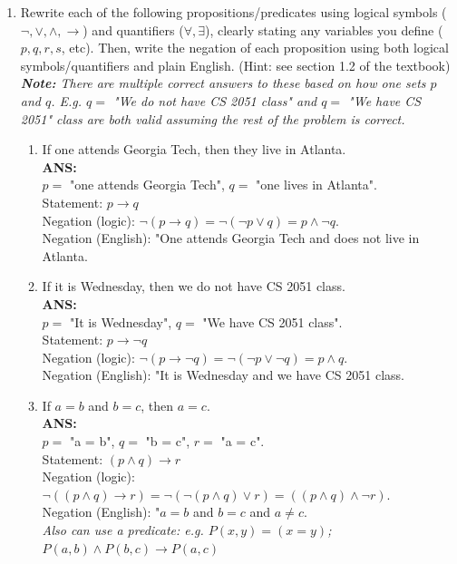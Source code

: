 \documentclass{article}
\begin{document}
\begin{enumerate}
\begin{enumerate}
    \end{enumerate}
    \item Rewrite each of the following propositions/predicates using logical symbols ($\neg, \lor, \land, \rightarrow$) and quantifiers ($\forall, \exists$), clearly stating any variables you define ($p, q, r, s$, etc). Then, write the negation of each proposition using both logical symbols/quantifiers and plain English. (Hint: see section 1.2 of the textbook) \\
    \textit{\textbf{Note:} There are multiple correct answers to these based on how one sets $p$ and $q$. E.g. $q = $ "We do not have CS 2051 class" and $q = $ "We have CS 2051" class are both valid assuming the rest of the problem is correct.} \\
    \begin{enumerate}
        \item If one attends Georgia Tech, then they live in Atlanta. \\
        \textbf{ANS: } \\
        $p = $ "one attends Georgia Tech", $q = $ "one lives in Atlanta". \\
        Statement: $p \rightarrow q$ \\
        Negation (logic): $\neg (p \rightarrow q) = \neg (\neg p \lor q) = p \land \neg q$. \\
        Negation (English): "One attends Georgia Tech and does not live in Atlanta.
        
        \item If it is Wednesday, then we do not have CS 2051 class. \\
        \textbf{ANS: } \\
        $p = $ "It is Wednesday", $q = $ "We have CS 2051 class". \\
        Statement: $p \rightarrow \neg q$ \\
        Negation (logic): $\neg (p \rightarrow \neg q) = \neg (\neg p \lor \neg q) = p \land q$. \\
        Negation (English): "It is Wednesday and we have CS 2051 class. \\
        
        \item If $a = b$ and $b = c$, then $a = c$. \\
        \textbf{ANS: } \\
        $p = $ "a = b", $q = $ "b = c", $r = $ "a = c". \\
        Statement: $(p \land q) \rightarrow r$ \\
        Negation (logic): $\neg ((p \land q) \rightarrow r) = \neg (\neg (p \land q) \lor r) = ((p \land q) \land \neg r)$. \\
        Negation (English): "$a = b$ and $b = c$ and $a \neq c$. \\
        \textit{Also can use a predicate: e.g. $P(x, y) = (x = y)$; $P(a, b) \land P(b, c) \rightarrow P(a, c)$}
        

\end{enumerate}
\end{enumerate}
\end{document}
